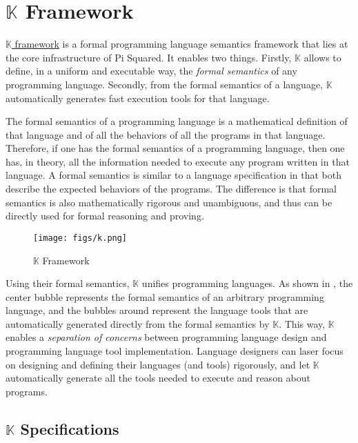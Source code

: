 \documentclass{article}
\newcommand{\K}{\ensuremath{\mathbb{K}}\xspace}
\begin{document}
\begin{center}
\noindent{}
\end{center}

\section{\K Framework}
\label{sec:k}

\href{https://kframework.org}{\K framework} is a formal programming language semantics framework
that lies at the core infrastructure of Pi Squared.
It enables two things.
Firstly, \K allows to define, in a uniform and executable way,
the \emph{formal semantics} of any programming language.
Secondly, from the formal semantics of a language, \K automatically generates fast execution tools
for that language.

The formal semantics of a programming language is a mathematical definition of that language
and of all the behaviors of all the programs in that language.
Therefore, if one has the formal semantics of a programming language, then one has, in theory,
all the information needed to execute any program written in that language.
A formal semantics is similar to a language specification in that both describe
the expected behaviors of the programs.
The difference is that formal semantics is also mathematically rigorous and unambiguous,
and thus can be directly used for formal reasoning and proving.

\begin{figure}
\centering
\texttt{[image: figs/k.png]}
\caption{\K Framework}
\label{fig:K}
\end{figure}

Using their formal semantics, \K unifies programming languages.
As shown in ,
the center bubble
represents the formal semantics of an arbitrary programming language,
and the bubbles around represent the language tools that are automatically generated
directly from the formal semantics by \K.
This way, 
\K enables a \emph{separation of concerns} between
programming language design and programming language tool implementation.
Language designers can laser focus on designing and defining their languages (and tools) rigorously,
and let \K automatically generate all the tools needed to execute and reason about programs.

\subsection{\K Specifications}
\label{sec:kspec}
\end{document}
